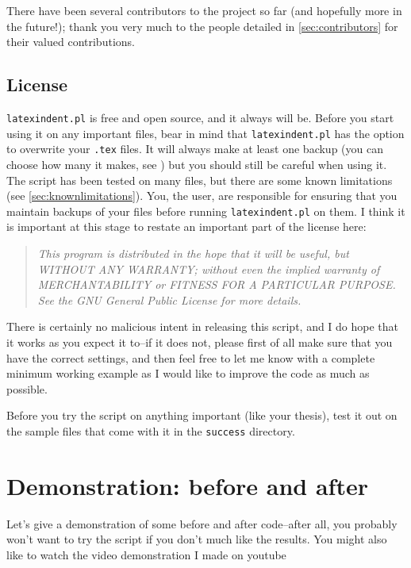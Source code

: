 \documentclass[11pt]{article}
\begin{document}
There have been several contributors to the project so far (and hopefully more in
the future!); thank you very much to the people detailed in \vref{sec:contributors}
for their valued contributions.

\subsection{License}
\lstinline!latexindent.pl! is free and open source, and it always will be.
Before you start using it on any important files, bear in mind that \lstinline!latexindent.pl! has the option to overwrite your \lstinline!.tex! files.
It will always make at least one backup (you can choose how many it makes, see )
but you should still be careful when using it. The script has been tested on many
files, but there are some known limitations (see \cref{sec:knownlimitations}).
You, the user, are responsible for ensuring that you maintain backups of your files
before running \lstinline!latexindent.pl! on them. I think it is important at this
stage to restate an important part of the license here:
\begin{quote}\itshape
	This program is distributed in the hope that it will be useful,
	but WITHOUT ANY WARRANTY; without even the implied warranty of
	MERCHANTABILITY or FITNESS FOR A PARTICULAR PURPOSE.  See the
	GNU General Public License for more details.
\end{quote}
There is certainly no malicious intent in releasing this script, and I do hope
that it works as you expect it to--if it does not, please first of all
make sure that you have the correct settings, and then feel free to let me know with a
complete minimum working example as I would like to improve the code as much as possible.

\begin{warning}
	Before you try the script on anything important (like your thesis), test it
	out on the sample files that come with it in the \lstinline!success! directory.
\end{warning}


\section{Demonstration: before and after}
Let's give a demonstration of some before and after code--after all, you probably
won't want to try the script if you don't much like the results. You might also
like to watch the video demonstration I made on youtube \cite{cmh:videodemo}
\end{document}
